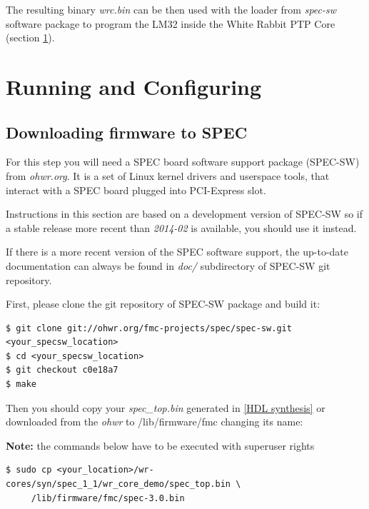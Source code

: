 \documentclass[a4paper, 12pt]{article}
\newcommand{\codeHook}[1]{\mbox{\ttfamily\MakeTextUppercase{#1}}}
\begin{document}
The resulting binary \textit{wrc.bin} can be then used with the loader from
\textit{spec-sw} software package to program the \codeHook{lm32} inside the White Rabbit \codeHook{ptp}
Core (section \ref{Running and Configuring}).

\section{Running and Configuring}
\label{Running and Configuring}

\subsection{Downloading firmware to SPEC}
\label{Downloading firmware to SPEC}

For this step you will need a \codeHook{spec} board software support package
(\codeHook{spec-sw}) from \textit{ohwr.org}. It is a set of Linux kernel drivers and
userspace tools, that interact with a \codeHook{spec} board plugged into PCI-Express
slot.

Instructions in this section are based on a development version of \codeHook{spec-sw}
so if a stable release more recent than \textit{2014-02} is available, you should
use it instead. 

If there is a more recent version of the \codeHook{spec} software support, the
up-to-date documentation can always be found in \textit{doc/} subdirectory of
\codeHook{spec-sw} git repository.

\vspace{1em}
First, please clone the git repository of \codeHook{spec-sw} package and build it:

\begin{lstlisting}
$ git clone git://ohwr.org/fmc-projects/spec/spec-sw.git <your_specsw_location>
$ cd <your_specsw_location>
$ git checkout c0e18a7
$ make
\end{lstlisting}

Then you should copy your \textit{spec\_top.bin} generated in \ref{HDL synthesis} or
downloaded from the \textit{ohwr} to /lib/firmware/fmc changing its
name:

\noindent\textbf{Note:} the commands below have to be executed with superuser rights

\begin{lstlisting}
$ sudo cp <your_location>/wr-cores/syn/spec_1_1/wr_core_demo/spec_top.bin \
     /lib/firmware/fmc/spec-3.0.bin
\end{lstlisting}
\end{document}
